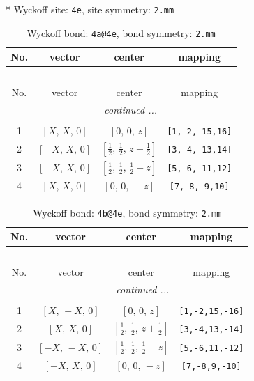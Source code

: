 \documentclass[fleqn,8pt]{jsarticle}
\begin{document}
* Wyckoff site: {\tt 4e}, site symmetry: {\tt 2.mm}
\renewcommand{\arraystretch}{1.2}
\begin{longtable}{cccc}
\caption{Wyckoff bond: {\tt 4a@4e}, bond symmetry: {\tt 2.mm}}
 \\
 \hline \hline
No. & vector & center & mapping \\ \hline \endfirsthead

\multicolumn{3}{l}{\tablename\ \thetable{}} \\
 \hline \hline
No. & vector & center & mapping \\ \hline \endhead

 \hline \hline
\multicolumn{3}{r}{\footnotesize\it continued ...} \\ \endfoot

 \hline \hline
\multicolumn{3}{r}{} \\ \endlastfoot

1 & $\left[ X,\, X,\, 0 \right]$ & $\left[ 0,\, 0,\, z \right]$ & {\tt [1,-2,-15,16]} \\ \hline
2 & $\left[ - X,\, X,\, 0 \right]$ & $\left[ \frac{1}{2},\, \frac{1}{2},\, z + \frac{1}{2} \right]$ & {\tt [3,-4,-13,14]} \\ \hline
3 & $\left[ - X,\, X,\, 0 \right]$ & $\left[ \frac{1}{2},\, \frac{1}{2},\, \frac{1}{2} - z \right]$ & {\tt [5,-6,-11,12]} \\ \hline
4 & $\left[ X,\, X,\, 0 \right]$ & $\left[ 0,\, 0,\, - z \right]$ & {\tt [7,-8,-9,10]} \\
\end{longtable}
\renewcommand{\arraystretch}{1.2}
\begin{longtable}{cccc}
\caption{Wyckoff bond: {\tt 4b@4e}, bond symmetry: {\tt 2.mm}}
 \\
 \hline \hline
No. & vector & center & mapping \\ \hline \endfirsthead

\multicolumn{3}{l}{\tablename\ \thetable{}} \\
 \hline \hline
No. & vector & center & mapping \\ \hline \endhead

 \hline \hline
\multicolumn{3}{r}{\footnotesize\it continued ...} \\ \endfoot

 \hline \hline
\multicolumn{3}{r}{} \\ \endlastfoot

1 & $\left[ X,\, - X,\, 0 \right]$ & $\left[ 0,\, 0,\, z \right]$ & {\tt [1,-2,15,-16]} \\ \hline
2 & $\left[ X,\, X,\, 0 \right]$ & $\left[ \frac{1}{2},\, \frac{1}{2},\, z + \frac{1}{2} \right]$ & {\tt [3,-4,13,-14]} \\ \hline
3 & $\left[ - X,\, - X,\, 0 \right]$ & $\left[ \frac{1}{2},\, \frac{1}{2},\, \frac{1}{2} - z \right]$ & {\tt [5,-6,11,-12]} \\ \hline
4 & $\left[ - X,\, X,\, 0 \right]$ & $\left[ 0,\, 0,\, - z \right]$ & {\tt [7,-8,9,-10]} \\
\end{longtable}
\end{document}
